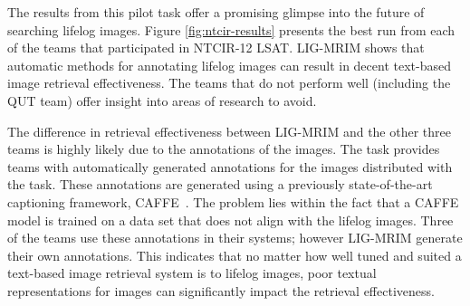 The results from this pilot task offer a promising glimpse into the future of searching lifelog images. Figure \ref{fig:ntcir-results} presents the best run from each of the teams that participated in NTCIR-12 LSAT. LIG-MRIM shows that automatic methods for annotating lifelog images can result in decent text-based image retrieval effectiveness. The teams that do not perform well (including the QUT team) offer insight into areas of research to avoid. 

The difference in retrieval effectiveness between LIG-MRIM and the other three teams is highly likely due to the annotations of the images. The task provides teams with automatically generated annotations for the images distributed with the task. These annotations are generated using a previously state-of-the-art captioning framework, CAFFE~\cite{jia2014caffe}. The problem lies within the fact that a CAFFE model is trained on a data set that does not align with the lifelog images. Three of the teams use these annotations in their systems; however LIG-MRIM generate their own annotations. This indicates that no matter how well tuned and suited a text-based image retrieval system is to lifelog images, poor textual representations for images can significantly impact the retrieval effectiveness.